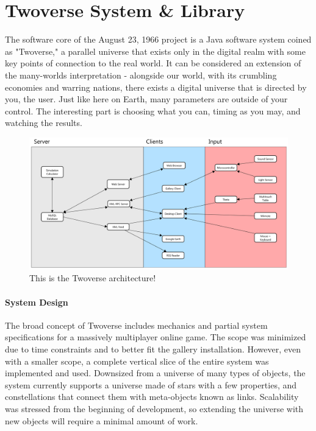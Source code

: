 \section{Twoverse System \& Library}
The software core of the August 23, 1966 project is a Java software system coined as "Twoverse," a parallel universe that exists only in the digital realm with some key points of connection to the real world. It can be considered an extension of the many-worlds interpretation - alongside our world, with its crumbling economies and warring nations, there exists a digital universe that is directed by you, the user. Just like here on Earth, many parameters are outside of your control. The interesting part is choosing what you can, timing as you may, and watching the results.

\begin{figure}[htp]\centering
\includegraphics[width=.99\textwidth]{images/twoverse_arch.jpg}
  \caption{This is the Twoverse architecture!}\label{fig:twoversearch}
\end{figure}
\paragraph{System Design}
The broad concept of Twoverse includes mechanics and partial system specifications for a massively multiplayer online game. The scope was minimized due to time constraints and to better fit the gallery installation. However, even with a smaller scope, a complete vertical slice of the entire system was implemented and used. Downsized from a universe of many types of objects, the system currently supports a universe made of stars with a few properties, and constellations that connect them with meta-objects known as links. Scalability was stressed from the beginning of development, so extending the universe with new objects will require a minimal amount of work.

